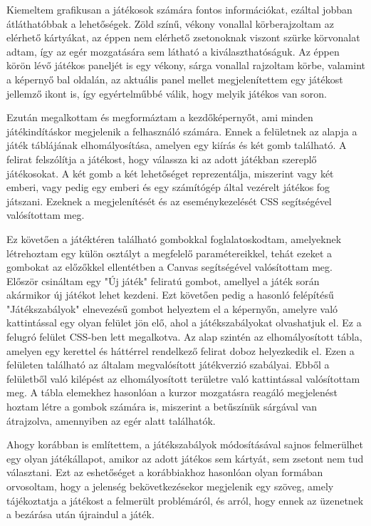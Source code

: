 Kiemeltem grafikusan a játékosok számára fontos információkat, ezáltal jobban átláthatóbbak a lehetőségek. Zöld színű, vékony vonallal körberajzoltam az elérhető kártyákat, az éppen nem elérhető zsetonoknak viszont szürke körvonalat adtam, így az egér mozgatására sem látható a kiválaszthatóságuk. Az éppen körön lévő játékos paneljét is egy vékony, sárga vonallal rajzoltam körbe, valamint a képernyő bal oldalán, az aktuális panel mellet megjelenítettem egy játékost jellemző ikont is, így egyértelműbbé válik, hogy melyik játékos van soron.

Ezután megalkottam és megformáztam a kezdőképernyőt, ami minden játékindításkor megjelenik a felhasználó számára. Ennek a felületnek az alapja a játék táblájának elhomályosítása, amelyen egy kiírás és két gomb található. A felirat felszólítja a játékost, hogy válassza ki az adott játékban szereplő játékosokat. A két gomb a két lehetőséget reprezentálja, miszerint vagy két emberi, vagy pedig egy emberi és egy számítógép által vezérelt játékos fog játszani. Ezeknek a megjelenítését és az eseménykezelését CSS segítségével valósítottam meg.


Ez követően a játéktéren található gombokkal foglalatoskodtam, amelyeknek létrehoztam egy külön osztályt a megfelelő paramétereikkel, tehát ezeket a gombokat az előzőkkel ellentétben a Canvas segítségével valósítottam meg. Először csináltam egy "Új játék" feliratú gombot, amellyel a játék során akármikor új játékot lehet kezdeni. Ezt követően pedig a hasonló felépítésű "Játékszabályok" elnevezésű gombot helyeztem el a képernyőn, amelyre való kattintással egy olyan felület jön elő, ahol a játékszabályokat olvashatjuk el. Ez a felugró felület CSS-ben lett megalkotva. Az alap szintén az elhomályosított tábla, amelyen egy kerettel és háttérrel rendelkező felirat doboz helyezkedik el. Ezen a felületen található az általam megvalósított játékverzió szabályai. Ebből a felületből való kilépést az elhomályosított területre való kattintással valósítottam meg. A tábla elemekhez hasonlóan a kurzor mozgatásra reagáló megjelenést hoztam létre a gombok számára is, miszerint a betűszínük sárgával van átrajzolva, amennyiben az egér alatt találhatók.


Ahogy korábban is említettem, a játékszabályok módosításával sajnos felmerülhet egy olyan játékállapot, amikor az adott játékos sem kártyát, sem zsetont nem tud választani. Ezt az eshetőséget a korábbiakhoz hasonlóan olyan formában orvosoltam, hogy a jelenség bekövetkezésekor megjelenik egy szöveg, amely tájékoztatja a játékost a felmerült problémáról, és arról, hogy ennek az üzenetnek a bezárása után újraindul a játék.


